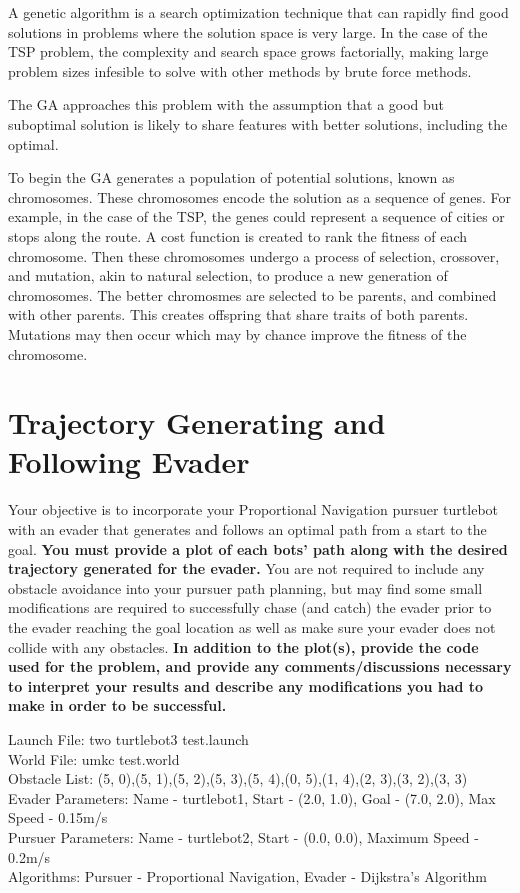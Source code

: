 \documentclass{article}
\begin{document}
\bigskip
A genetic algorithm is a search optimization technique that can rapidly find good solutions in problems where the solution space is very large. In the case of the TSP problem, the complexity and search space grows factorially, making large problem 
sizes infesible to solve with other methods by brute force methods.

The GA approaches this problem with the assumption that a good but suboptimal solution is likely to share features with better solutions, including the optimal.

To begin the GA generates a population of potential solutions, known as chromosomes. 
These chromosomes encode the solution as a sequence of genes. 
For example, in the case of the TSP, the genes could represent a sequence of cities or stops along the route.
A cost function is created to rank the fitness of each chromosome.
Then these chromosomes undergo a process of selection, crossover, and mutation, akin to natural selection, to produce a new generation of chromosomes.
The better chromosmes are selected to be parents, and combined with other parents. This creates offspring that share traits of both parents.
Mutations may then occur which may by chance improve the fitness of the chromosome.

\section{Trajectory Generating and Following Evader}

Your objective is to incorporate your Proportional Navigation pursuer turtlebot with an evader that
generates and follows an optimal path from a start to the goal. \textbf{You must provide a plot of each
bots’ path along with the desired trajectory generated for the evader.} You are not required to
include any obstacle avoidance into your pursuer path planning, but may find some small modifications
are required to successfully chase (and catch) the evader prior to the evader reaching the goal location
as well as make sure your evader does not collide with any obstacles. \textbf{In addition to the plot(s),
provide the code used for the problem, and provide any comments/discussions necessary
to interpret your results and describe any modifications you had to make in order to be
successful.}

\bigskip
\noindent Launch File: two turtlebot3 test.launch \\
World File: umkc test.world \\
Obstacle List: (5, 0),(5, 1),(5, 2),(5, 3),(5, 4),(0, 5),(1, 4),(2, 3),(3, 2),(3, 3) \\
Evader Parameters: Name - turtlebot1, Start - (2.0, 1.0), Goal - (7.0, 2.0), Max Speed - 0.15m/s \\
Pursuer Parameters: Name - turtlebot2, Start - (0.0, 0.0), Maximum Speed - 0.2m/s \\ 
Algorithms: Pursuer - Proportional Navigation, Evader - Dijkstra’s Algorithm \\
\end{document}
